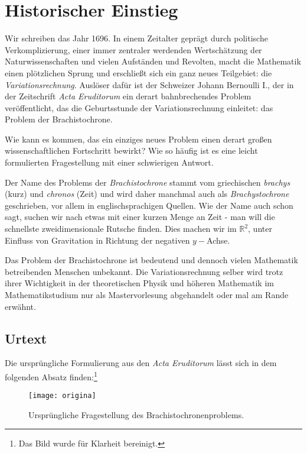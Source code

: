 
\chapter{Historischer Einstieg}
Wir schreiben das Jahr 1696. 
In einem Zeitalter geprägt durch politische Verkomplizierung, einer immer zentraler werdenden Wertschätzung der Naturwissenschaften und vielen Aufständen und Revolten, macht die Mathematik einen plötzlichen Sprung und erschließt sich ein ganz neues Teilgebiet: die \textit{Variationsrechnung}. 
Auslöser dafür ist der Schweizer Johann Bernoulli I., der in der Zeitschrift \textit{Acta Eruditorum} ein derart bahnbrechendes Problem veröffentlicht, das die Geburtsstunde der Variationsrechnung einleitet: das Problem der Brachistochrone.

Wie kann es kommen, das ein einziges neues Problem einen derart großen wissenschaftlichen Fortschritt bewirkt? Wie so häufig ist es eine leicht formulierten Fragestellung mit einer schwierigen Antwort.

Der Name des Problems der \textit{Brachistochrone} stammt vom griechischen \textit{brachys} (kurz) und \textit{chronos} (Zeit) und wird daher manchmal auch als \textit{Brachystochrone} geschrieben, vor allem in englischsprachigen Quellen. 
Wie der Name auch schon sagt, suchen wir nach etwas mit einer kurzen Menge an Zeit - man will die schnellste zweidimensionale Rutsche finden. 
Dies machen wir im $\mathbb{R}^2$, unter Einfluss von Gravitation in Richtung der negativen $y-$Achse.

Das Problem der Brachistochrone ist bedeutend und dennoch vielen Mathematik betreibenden Menschen unbekannt. 
Die Variationsrechnung selber wird trotz ihrer Wichtigkeit in der theoretischen Physik und höheren Mathematik im Mathematikstudium nur als Mastervorlesung abgehandelt oder mal am Rande erwähnt.

\section{Urtext}
Die ursprüngliche Formulierung aus den \textit{Acta Eruditorum} lässt sich in dem folgenden Absatz finden:\footnote{Das Bild wurde für Klarheit bereinigt.}

\begin{figure}[ht]
  
  \centering  
  \texttt{[image: origina]}
  \caption[Ursprüngliche Fragestellung des Brachistochronenproblems. Acta Eruditorum, S. 285. Original aus der Universität Michigan \url{https://babel.hathitrust.org/cgi/pt?id=mdp.39015067096282}]
  {Ursprüngliche Fragestellung des Brachistochronenproblems.}
  \label{fig:acta1}
\end{figure} 

